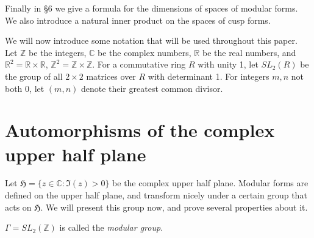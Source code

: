 \documentclass{article}
\begin{document}
Finally in \S 6 we give a formula for the dimensions of spaces of modular forms. We also introduce a natural inner
product on the spaces of cusp forms.

We will now introduce some notation that will be used throughout this paper.
Let $\mathbb{Z}$ be the integers, $\mathbb{C}$ be the complex numbers, $\mathbb{R}$ be the real numbers, and
$\mathbb{R}^2=\mathbb{R} \times \mathbb{R}$, $\mathbb{Z}^2=\mathbb{Z} \times \mathbb{Z}$. For a commutative ring $R$ with unity 1, let 
$SL_2(R)$ be the group
of all $2 \times 2$ matrices over $R$ with determinant 1. For integers $m,n$ not both $0$,
let $(m,n)$ denote their greatest common divisor.

\section{Automorphisms of the complex upper half plane}
Let $\mathfrak{H}=\{z \in \mathbb{C}:\Im(z)>0\}$ be the complex upper half plane. Modular forms are defined
on the upper half plane, and transform nicely under a certain group that acts on $\mathfrak{H}$. We will present
this group now, and prove several properties about it.

$\Gamma=SL_2(\mathbb{Z})$ is called the {\em modular group}.
\end{document}
